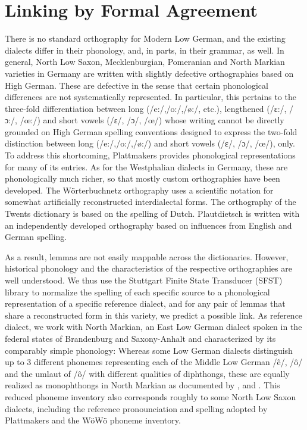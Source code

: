 \documentclass[11pt]{article}
\begin{document}
\section{Linking by Formal Agreement}
\label{sec-linking-by-agreement}

There is no standard orthography for Modern Low German, and the existing dialects differ in their phonology, and, in parts, in their grammar, as well.
In general, North Low Saxon, Mecklenburgian, Pomeranian and North Markian varieties in Germany are written with slightly defective orthographies based on High German. These are defective in the sense that certain phonological differences are not systematically represented. In particular, this pertains to the three-fold differentiation between long (/e:/,/o:/,/ø:/, etc.), lengthened (/ɛ:/, /ɔ:/, /œ:/) and short vowels (/ɛ/, /ɔ/, /œ/) whose writing cannot be directly grounded on High German spelling conventions designed to express the two-fold distinction between long (/e:/,/o:/,/ø:/) and short vowels (/ɛ/, /ɔ/, /œ/), only. 
To address this shortcoming, Plattmakers provides phonological representations for many of its entries. As for the Westphalian dialects in Germany, these are phonologically much richer, so that mostly custom orthographies have been developed. The Wörterbuchnetz orthography uses a scientific notation for somewhat artificially reconstructed interdialectal forms. The orthography of the Twents dictionary is based on the spelling of Dutch. Plautdietsch is written with an independently developed orthography based on influences from English and German spelling.

As a result, lemmas are not easily mappable across the dictionaries. However, historical phonology and the characteristics of the respective orthographies are well understood.
We thus use the Stuttgart Finite State Transducer (SFST) library to normalize the spelling of each specific source to a phonological representation of a specific reference dialect, and for any pair of lemmas that share a reconstructed form in this variety, we predict a possible link. 
As reference dialect, we work with North Markian, an East Low German dialect spoken in the federal states of Brandenburg and Saxony-Anhalt and characterized by its comparably simple phonology: Whereas some Low German dialects distinguish up to 3 different phonemes representing each of the Middle Low German /ê/, /ô/ and the umlaut of /ô/ with different qualities of diphthongs, these are equally realized as monophthongs in North Markian as documented by \cite{pfaff1898vocale}, \cite{mackel1905mundart} and \cite{teuchert1907mundart}. This reduced phoneme inventory also corresponds roughly to some North Low Saxon dialects, including the reference pronounciation and spelling adopted by Plattmakers and the WöWö phoneme inventory.
\end{document}
